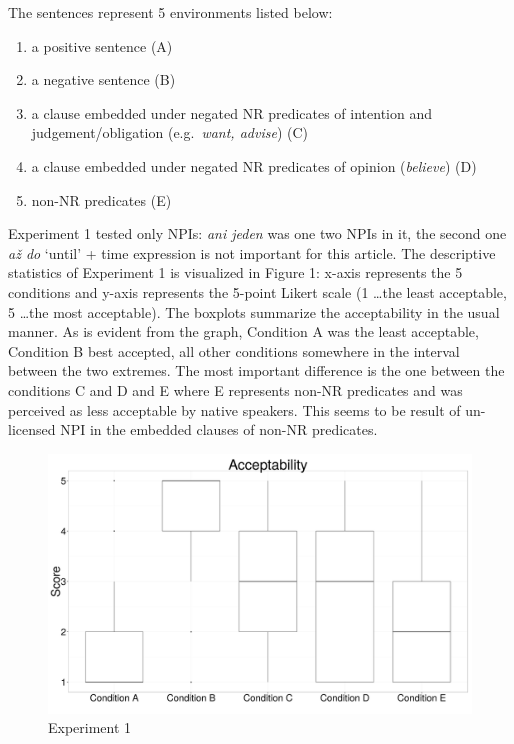 \documentclass[12pt]{scrartcl}
\providecommand{\tightlist}{%
  \setlength{\itemsep}{0pt}\setlength{\parskip}{0pt}}
\begin{document}
The sentences represent 5 environments listed below:

\begin{enumerate}
\def\labelenumi{(\Alph{enumi})}
\tightlist
\item
  a positive sentence (A)
\item
  a negative sentence (B)
\item
  a clause embedded under negated NR predicates of intention and
  judgement/obligation (e.g.~\emph{want, advise}) (C)
\item
  a clause embedded under negated NR predicates of opinion
  (\emph{believe}) (D)
\item
  non-NR predicates (E)
\end{enumerate}

Experiment 1 tested only NPIs: \emph{ani jeden} was one two NPIs in it, the second one \textit{až do} `until' + time expression is not important for this article. The descriptive statistics of Experiment 1 is visualized in Figure 1: x-axis represents the 5 conditions and y-axis represents the 5-point Likert scale (1 \ldots the least acceptable, 5 \ldots the most acceptable). The boxplots summarize the acceptability in the usual manner. As is evident from the graph, Condition A was the least acceptable, Condition B best accepted, all other conditions somewhere in the interval between the two extremes. The most important difference is the one between the conditions C and D and E where E represents non-NR predicates and was perceived as less acceptable by native speakers. This seems to be result of un-licensed NPI in the embedded clauses of non-NR predicates.

\begin{figure}
\centering
\includegraphics{include/boxplot-exp1.png}
\caption{Experiment 1}
\end{figure}
\end{document}
